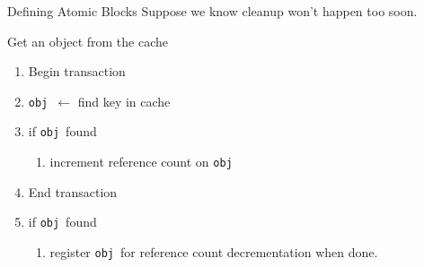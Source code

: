 \documentclass[]{beamer}
\newcommand{\obj}{{\tt obj}~}
\begin{document}
\begin{frame}{Defining Atomic Blocks}
Suppose we know cleanup won't happen too soon.
\begin{exampleblock}{Get an object from the cache}
\begin{enumerate}
\item Begin transaction
\item \obj $\leftarrow$ find key in cache
\item if \obj found
\begin{enumerate}
\item increment reference count on \obj
\end{enumerate}
\item End transaction
\item<alert@1> if \obj found
\begin{enumerate}
\item register \obj for reference count decrementation when done.
\end{enumerate}
\end{enumerate}
\end{exampleblock}
\end{frame}
\end{document}
